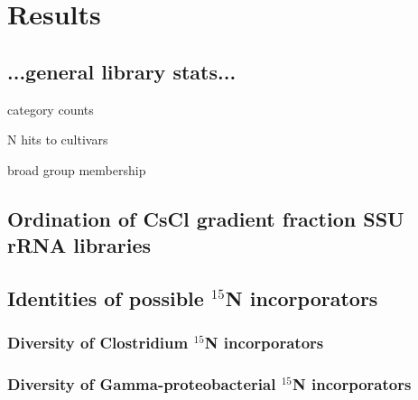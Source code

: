 \section{Results}

\subsection{...general library stats...}

category counts

N hits to cultivars

broad group membership

\subsection{Ordination of CsCl gradient fraction SSU rRNA libraries}
\subsection{Identities of possible $^{15}$N incorporators}
\subsubsection{Diversity of Clostridium $^{15}$N incorporators}
\subsubsection{Diversity of Gamma-proteobacterial $^{15}$N incorporators}



